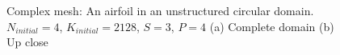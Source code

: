 \begin{figure}[H]
	\centering
	\hfill
	\caption{Complex mesh: An airfoil in an unstructured circular domain. \(N_{initial} = 4\), \(K_{initial} = 2128\), \(S = 3\), \(P = 4\) (a) Complete domain (b) Up close}\label{fig:complex_mesh}
\end{figure}

